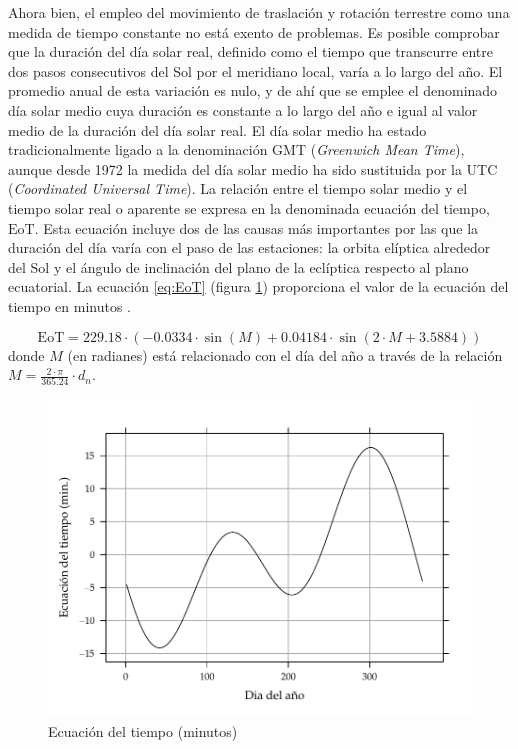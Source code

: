 Ahora bien, el empleo del movimiento de traslación y rotación terrestre
como una medida de tiempo constante no está exento de problemas. Es
posible comprobar que la duración del día solar real, definido como
el tiempo que transcurre entre dos pasos consecutivos del Sol por
el meridiano local, varía a lo largo del año. El promedio anual de
esta variación es nulo, y de ahí que se emplee el denominado día solar
medio cuya duración es constante a lo largo del año e igual al valor
medio de la duración del día solar real. El día solar medio ha estado
tradicionalmente ligado a la denominación GMT (\emph{Greenwich Mean
Time}), aunque desde 1972 la medida del día solar medio ha sido sustituida
por la UTC (\emph{Coordinated Universal Time}). La relación entre
el tiempo solar medio y el tiempo solar real o aparente se expresa
en la denominada ecuación del tiempo, $\mathrm{EoT}$.
Esta ecuación incluye dos de las causas más importantes por las que
la duración del día varía con el paso de las estaciones: la orbita
elíptica alrededor del Sol y el ángulo de inclinación del plano de
la eclíptica respecto al plano ecuatorial. La ecuación \ref{eq:EoT}
(figura \ref{fig:EoT}) proporciona el valor de la ecuación del tiempo
en minutos \cite{Whitman2003}.

\begin{equation}
\mathrm{EoT}=229.18\cdot\left(-0.0334\cdot\sin(M)+0.04184\cdot\sin\left(2\cdot
    M+3.5884\right)\right)\label{eq:EoT}\end{equation}
donde $M$ (en radianes) está relacionado con el día del año a través de la relación
$M=\frac{2\cdot\pi}{365.24}\cdot d_{n}$.

%
\begin{figure}


\begin{centering}
\includegraphics[scale=0.65]{../figs/EoT}
\end{centering}

\caption{Ecuación del tiempo (minutos)\label{fig:EoT}}



\end{figure}


